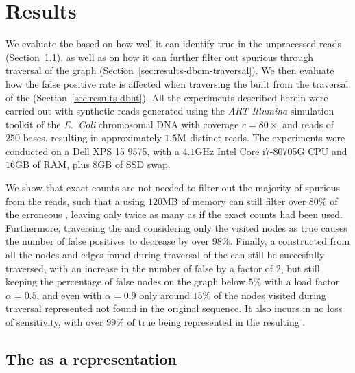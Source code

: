 \chapter{Results}

We evaluate the \dBCM based on how well it can identify true  in the unprocessed reads (Section~\ref{sec:results-dbcm-counting}), as well as on how it can further filter out spurious  through traversal of the graph (Section~\ref{sec:results-dbcm-traversal}). We then evaluate how the false positive rate is affected when traversing the \dBHT built from the traversal of the \dBCM (Section~\ref{sec:results-dbht}). All the experiments described herein were carried out with synthetic reads generated using the \emph{ART Illumina} simulation toolkit \cite{Huang2011} of the \emph{E.~Coli} chromosomal DNA \cite{ecoligenome} with coverage $c = 80\times$ and reads of $250$ bases, resulting in approximately $1.5\mega$ distinct reads. The experiments were conducted on a Dell XPS 15 9575, with a $4.1$GHz Intel Core i7-80705G CPU and $16$GB of RAM, plus $8$GB of SSD swap.

We show that exact counts are not needed to filter out the majority of spurious  from the reads, such that a \dBCM using $120$MB of memory can still filter over $80\%$ of the erroneous , leaving only twice as many as if the exact counts had been used. Furthermore, traversing the \dBCM and considering only the visited nodes as true  causes the number of false positives to decrease by over $98\%$. Finally, a \dBHT constructed from all the nodes and edges found during traversal of the \dBCM can still be succesfully traversed, with an increase in the number of false  by a factor of $2$, but still keeping the percentage of false nodes on the graph below $5\%$ with a load factor $\alpha = 0.5$, and even with $\alpha = 0.9$ only around $15\%$ of the nodes visited during traversal represented  not found in the original sequence. It also incurs in no loss of sensitivity, with over $99\%$ of true  being represented in the resulting \dBG. 

\section{The \dBCM as a \dBG representation}
\label{sec:results-dbcm-counting}

